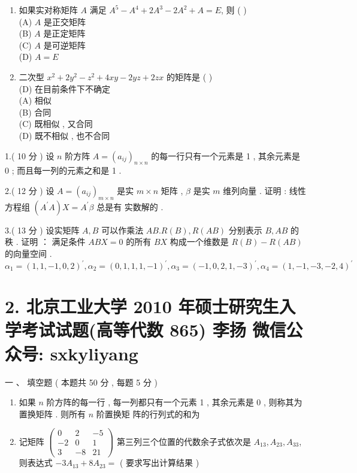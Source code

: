\documentclass[10pt]{article}
\begin{document}
{\begin{enumerate}
  \item  如果实对称矩阵  $A$  满足  $A^{5}-A^{4}+2 A^{3}-2 A^{2}+A=E$,  则  ( )\\
(A) $A$  是正交矩阵 \\
(B) $A$  是正定矩阵 \\
(C) $A$  是可逆矩阵 \\
(D) $A=E$

  \item  二次型  $x^{2}+2 y^{2}-z^{2}+4 x y-2 y z+2 z x$  的矩阵是  ( )\\
(D)  在目前条件下不确定 \\
(A)  相似 \\
(B)  合同 \\
(C)  既相似 ,  又合同 \\
(D)  既不相似 ,  也不合同 

\end{enumerate}
1.( 10  分 )  设  $n$  阶方阵  $A=\left(a_{i j}\right)_{n \times n}$  的每一行只有一个元素是  1 ,  其余元素是  0 ;  而且每一列的元素之和是  1 .

2.( 12  分 )  设  $A=\left(a_{i j}\right)_{m \times n}$  是实  $m \times n$  矩阵 , $\beta$  是实  $m$  维列向量 .  证明 :  线性方程组  $\left(A^{\prime} A\right) X=A^{\prime} \beta$  总是有   实数解的 .

3.( 13  分 )  设实矩阵  $A, B$  可以作乘法  $A B . R(B), R(A B)$  分别表示  $B, A B$  的秩 .  证明 ： 满足条件  $A B X=0$  的所有  $B X$  构成一个维数是  $R(B)-R(A B)$  的向量空间 .
$$
\alpha_{1}=(1,1,-1,0,2)^{\prime}, \alpha_{2}=(0,1,1,1,-1)^{\prime}, \alpha_{3}=(-1,0,2,1,-3)^{\prime}, \alpha_{4}=(1,-1,-3,-2,4)^{\prime}
$$

\section{2. 北京工业大学 2010 年硕士研究生入学考试试题(高等代数 865) 
 李扬 
 微信公众号: sxkyliyang}
 一 、 填空题 ( 本题共  50  分 , 每题  5  分 )

\begin{enumerate}
  \item  如果  $n$  阶方阵的每一行 ,  每一列都只有一个元素  1 ,  其余元素是  0 ,  则称其为置换矩阵 .  则所有  $n$  阶置换矩   阵的行列式的和为 

  \item  记矩阵  $\left(\begin{array}{ccc}0 & 2 & -5 \\ -2 & 0 & 1 \\ 3 & -8 & 21\end{array}\right)$  第三列三个位置的代数余子式依次是  $A_{13}, A_{23}, A_{33}$,  则表达式  $-3 A_{13}+8 A_{23}=$ ( 要求写出计算结果 )


\end{enumerate}}
\end{document}
